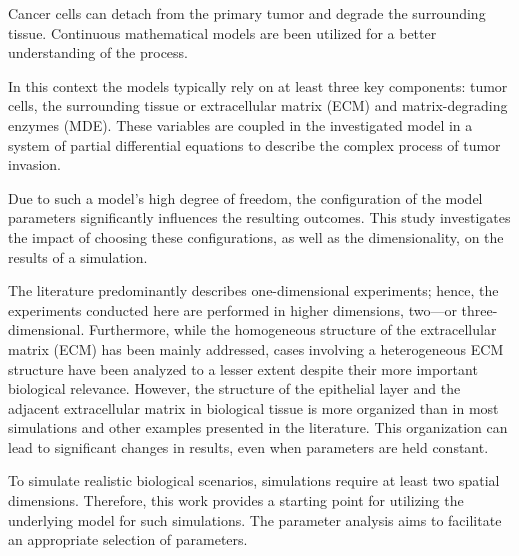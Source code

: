 Cancer cells can detach from the primary tumor and degrade the surrounding tissue. 
Continuous mathematical models are been utilized for a better understanding of the process.

In this context the models typically rely on at least three key components: tumor cells, the surrounding tissue or extracellular matrix (ECM) and matrix-degrading enzymes (MDE). These variables are coupled in the investigated model in a  system of partial differential equations to describe the complex process of tumor invasion.

Due to such a model's high degree of freedom, the configuration of the model parameters significantly influences the resulting outcomes. This study investigates the impact of choosing these configurations, as well as the dimensionality, on the results of a simulation.

The literature predominantly describes one-dimensional experiments; hence, the experiments conducted here are performed in higher dimensions, two—or three-dimensional. Furthermore, while the homogeneous structure of the extracellular matrix (ECM) has been mainly addressed, cases involving a heterogeneous ECM structure have been analyzed to a lesser extent despite their more important biological relevance. However, the structure of the epithelial layer and the adjacent extracellular matrix in biological tissue is more organized than in most simulations and other examples presented in the literature. This organization can lead to significant changes in results, even when parameters are held constant.

To simulate realistic biological scenarios, simulations require at least two spatial dimensions. Therefore, this work provides a starting point for utilizing the underlying model for such simulations. The parameter analysis aims to facilitate an appropriate selection of parameters.
